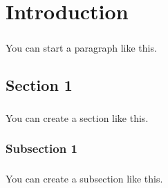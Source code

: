 \chapter{Introduction}
\label{chap:introduction}

\paragraph{} You can start a paragraph like this. 

\section{Section 1}
\paragraph{} You can create a section like this.
\subsection{Subsection 1}
\paragraph{} You can create a subsection like this.
